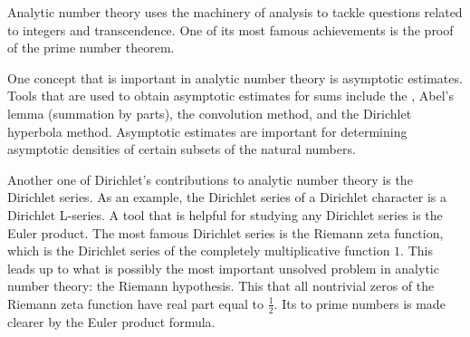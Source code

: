 \documentclass[12pt]{article}
\begin{document}
Analytic number theory uses the machinery of analysis to tackle questions related to integers and transcendence. One of its most famous achievements is the proof of the prime number theorem.

One concept that is important in analytic number theory is asymptotic estimates.  Tools that are used to obtain asymptotic estimates for sums include the , Abel's lemma (summation by parts), the convolution method, and the Dirichlet hyperbola method.  Asymptotic estimates are important for determining asymptotic densities of certain subsets of the natural numbers.

Another one of Dirichlet's contributions to analytic number theory is the Dirichlet series.  As an example, the Dirichlet series of a Dirichlet character is a Dirichlet L-series.  A tool that is helpful for studying any Dirichlet series is the Euler product.  The most famous Dirichlet series is the Riemann zeta function, which is the Dirichlet series of the completely multiplicative function $1$.  This leads up to what is possibly the most important unsolved problem in analytic number theory:  the Riemann hypothesis.  This  that all nontrivial zeros of the Riemann zeta function have real part equal to $\frac{1}{2}$.  Its  to prime numbers is made clearer by the Euler product formula.
\end{document}
